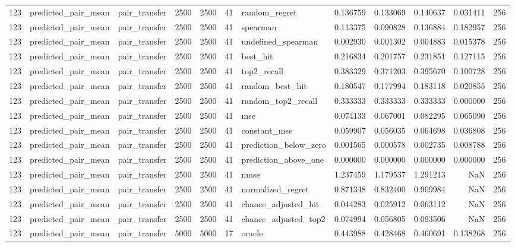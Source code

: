 \begin{tabular}{rllrrrlrrrrr}
123 & predicted_pair_mean & pair_transfer & 2500 & 2500 & 41 & random_regret & 0.136759 & 0.133069 & 0.140637 & 0.031411 & 256 \\
123 & predicted_pair_mean & pair_transfer & 2500 & 2500 & 41 & spearman & 0.113375 & 0.090828 & 0.136884 & 0.182957 & 256 \\
123 & predicted_pair_mean & pair_transfer & 2500 & 2500 & 41 & undefined_spearman & 0.002930 & 0.001302 & 0.004883 & 0.015378 & 256 \\
123 & predicted_pair_mean & pair_transfer & 2500 & 2500 & 41 & best_hit & 0.216834 & 0.201757 & 0.231851 & 0.127115 & 256 \\
123 & predicted_pair_mean & pair_transfer & 2500 & 2500 & 41 & top2_recall & 0.383329 & 0.371203 & 0.395670 & 0.100728 & 256 \\
123 & predicted_pair_mean & pair_transfer & 2500 & 2500 & 41 & random_best_hit & 0.180547 & 0.177994 & 0.183118 & 0.020855 & 256 \\
123 & predicted_pair_mean & pair_transfer & 2500 & 2500 & 41 & random_top2_recall & 0.333333 & 0.333333 & 0.333333 & 0.000000 & 256 \\
123 & predicted_pair_mean & pair_transfer & 2500 & 2500 & 41 & mse & 0.074133 & 0.067001 & 0.082295 & 0.065090 & 256 \\
123 & predicted_pair_mean & pair_transfer & 2500 & 2500 & 41 & constant_mse & 0.059907 & 0.056035 & 0.064698 & 0.036808 & 256 \\
123 & predicted_pair_mean & pair_transfer & 2500 & 2500 & 41 & prediction_below_zero & 0.001565 & 0.000578 & 0.002735 & 0.008788 & 256 \\
123 & predicted_pair_mean & pair_transfer & 2500 & 2500 & 41 & prediction_above_one & 0.000000 & 0.000000 & 0.000000 & 0.000000 & 256 \\
123 & predicted_pair_mean & pair_transfer & 2500 & 2500 & 41 & nmse & 1.237459 & 1.179537 & 1.291213 & NaN & 256 \\
123 & predicted_pair_mean & pair_transfer & 2500 & 2500 & 41 & normalized_regret & 0.871348 & 0.832400 & 0.909984 & NaN & 256 \\
123 & predicted_pair_mean & pair_transfer & 2500 & 2500 & 41 & chance_adjusted_hit & 0.044283 & 0.025912 & 0.063112 & NaN & 256 \\
123 & predicted_pair_mean & pair_transfer & 2500 & 2500 & 41 & chance_adjusted_top2 & 0.074994 & 0.056805 & 0.093506 & NaN & 256 \\
123 & predicted_pair_mean & pair_transfer & 5000 & 5000 & 17 & oracle & 0.443988 & 0.428468 & 0.460691 & 0.138268 & 256 \\

\end{tabular}
